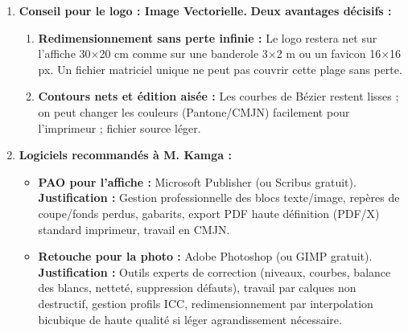 \documentclass[11pt]{article}
\newcommand{\cle}[1]{{\popxbold\color{popdark}#1}}
\begin{document}
\begin{corrige}
\begin{enumerate}
\item \textbf{Conseil pour le logo : Image \cle{Vectorielle}.}
\textbf{Deux avantages décisifs :}
\begin{enumerate}
\item \textbf{Redimensionnement sans perte infinie :} Le logo restera net sur l'affiche 30$\times$20 cm comme sur une banderole 3$\times$2 m ou un favicon 16$\times$16 px. Un fichier matriciel unique ne peut pas couvrir cette plage sans perte.
\item \textbf{Contours nets et édition aisée :} Les courbes de Bézier restent lisses ; on peut changer les couleurs (Pantone/CMJN) facilement pour l'imprimeur ; fichier source léger.
\end{enumerate}

\item \textbf{Logiciels recommandés à M. Kamga :}
\begin{itemize}
\item \textbf{PAO pour l'affiche :} \cle{Microsoft Publisher} (ou \cle{Scribus} gratuit).
\textbf{Justification :} Gestion professionnelle des blocs texte/image, repères de coupe/fonds perdus, gabarits, export PDF haute définition (PDF/X) standard imprimeur, travail en CMJN.
\item \textbf{Retouche pour la photo :} \cle{Adobe Photoshop} (ou \cle{GIMP} gratuit).
\textbf{Justification :} Outils experts de correction (niveaux, courbes, balance des blancs, netteté, suppression défauts), travail par calques non destructif, gestion profils ICC, redimensionnement par interpolation bicubique de haute qualité si léger agrandissement nécessaire.
\end{itemize}
\end{enumerate}
\end{corrige}
\end{document}
